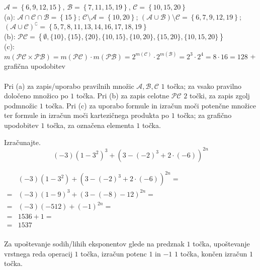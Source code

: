 \documentclass[addpoints]{exam}
\begin{document}
\begin{questions}
    \begin{solution}[9cm]
        $\mathcal{A}=\left\{6,9,12,15\right\}$, $\mathcal{B}=\left\{7,11,15,19\right\}$, $\mathcal{C}=\left\{10,15,20\right\}$ \\
        (a): $\mathcal{A}\cap\mathcal{C}\cap\mathcal{B}=\left\{15\right\}$; $\mathcal{C}\setminus\mathcal{A}=\left\{10,20\right\}$; $(\mathcal{A}\cup\mathcal{B})\setminus\mathcal{C}=\left\{6,7,9,12,19\right\}$; $(\mathcal{A}\cup\mathcal{C})^\complement=\left\{5,7,8,11,13,14,16,17,18,19\right\}$ \\
        (b): $\mathcal{PC}=\left\{\emptyset, \{10\}, \{15\}, \{20\}, \{10,15\}, \{10,20\}, \{15,20\}, \{10,15,20\}\right\}$ \\
        (c): $m(\mathcal{PC}\times\mathcal{PB})=m(\mathcal{PC})\cdot m(\mathcal{PB})=2^{m(\mathcal{C})}\cdot 2^{m(\mathcal{B})} = 2^3\cdot 2^4=8\cdot 16 = 128$ + grafična upodobitev\\ \\
        Pri (a) za zapis/uporabo pravilnih množic $\mathcal{A}, \mathcal{B}, \mathcal{C}$ $1$ točka; za vsako pravilno določeno množico po $1$ točka. Pri (b) za zapis celotne $\mathcal{PC}$ $2$ točki, za zapis zgolj podmnožic $1$ točka. 
        Pri (c) za uporabo formule in izračun moči potenčne množice ter formule in izračun moči kartezičnega produkta po $1$ točka; za grafično upodobitev $1$ točka, za označena elementa $1$ točka.
    \end{solution}






    \newpage
        

    \question[4]
    Izračunajte. $$ (-3)\left(1-3^2\right)^3+\left(3-(-2)^3+2\cdot(-6)\right)^{2n}$$

    \begin{solution}[7cm]
            $\begin{aligned}
                &(-3)\left(1-3^2\right)+\left(3-(-2)^3+2\cdot(-6)\right)^{2n}= \\
                    =& (-3)(1-9)^3+(3-(-8)-12)^{2n}=\\
                    =& (-3)(-512)+(-1)^{2n}= \\
                    =& 1536+1= \\
                    =& 1537
            \end{aligned} $ \\ \\
            Za upoštevanje sodih/lihih eksponentov glede na predznak $1$ točka, upoštevanje vrstnega reda operacij $1$ točka, izračun potenc $1$ in $-1$ $1$ točka, končen izračun $1$ točka.
    \end{solution}




\end{questions}
\end{document}
